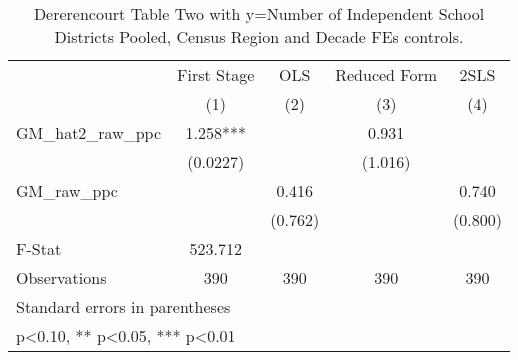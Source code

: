 \begin{table}[htbp]\centering
\def\sym#1{\ifmmode^{#1}\else\(^{#1}\)\fi}
\caption{Dererencourt Table Two with y=Number of Independent School Districts  Pooled, Census Region and Decade FEs controls.}
\begin{tabular}{l*{4}{c}}
\toprule
                    & First Stage   &         OLS   &Reduced Form   &        2SLS   \\
                    &\multicolumn{1}{c}{(1)}   &\multicolumn{1}{c}{(2)}   &\multicolumn{1}{c}{(3)}   &\multicolumn{1}{c}{(4)}   \\
\midrule
GM\_hat2\_raw\_ppc     &       1.258***&               &       0.931   &               \\
                    &    (0.0227)   &               &     (1.016)   &               \\
\addlinespace
GM\_raw\_ppc          &               &       0.416   &               &       0.740   \\
                    &               &     (0.762)   &               &     (0.800)   \\
\midrule
F-Stat              &     523.712   &               &               &               \\
Observations        &         390   &         390   &         390   &         390   \\
\bottomrule
\multicolumn{5}{l}{\footnotesize Standard errors in parentheses}\\
\multicolumn{5}{l}{\footnotesize * p<0.10, ** p<0.05, *** p<0.01}\\
\end{tabular}
\end{table}
